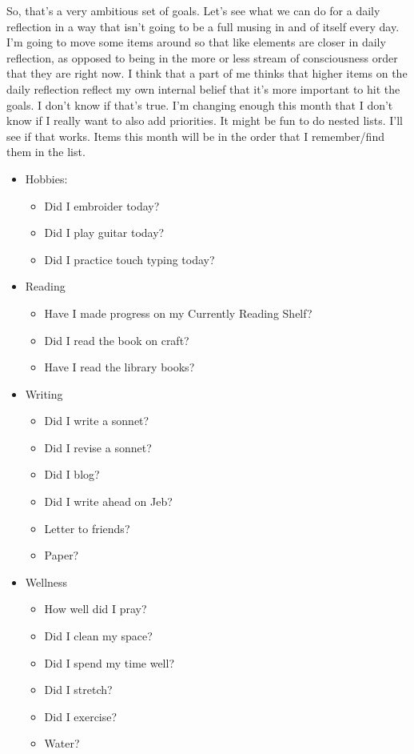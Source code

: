 \documentclass[12pt]{article}[titlepage]
\renewcommand{\,}{\textsuperscript{,}}
\begin{document}
So, that's a very ambitious set of goals.
Let's see what we can do for a daily reflection in a way that isn't going to be a full musing in and of itself every day.
I'm going to move some items around so that like elements are closer in daily reflection, as opposed to being in the more or less stream of consciousness order that they are right now.
I think that a part of me thinks that higher items on the daily reflection reflect my own internal belief that it's more important to hit the goals.
I don't know if that's true.
I'm changing enough this month that I don't know if I really want to also add priorities.
It might be fun to do nested lists.
I'll see if that works.
Items this month will be in the order that I remember/find them in the list. 
\begin{itemize}
\item Hobbies:
\begin{itemize}
\item Did I embroider today?
\item Did I play guitar today?
\item Did I practice touch typing today? 
\end{itemize}
\item Reading
\begin{itemize}
\item Have I made progress on my Currently Reading Shelf?
\item Did I read the book on craft?
\item Have I read the library books?
\end{itemize}
\item Writing
\begin{itemize}
\item Did I write a sonnet?
\item Did I revise a sonnet?
\item Did I blog?
\item Did I write ahead on Jeb?
\item Letter to friends?
\item Paper? 
\end{itemize}
\item Wellness
\begin{itemize}
\item How well did I pray?
\item Did I clean my space?
\item Did I spend my time well?
\item Did I stretch?
\item Did I exercise?
\item Water? 
\end{itemize} 
\end{itemize}
 
\end{document}
